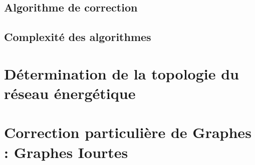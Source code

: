 \documentclass[onecolumn, 12pt]{book}
\begin{document}
	\subsection{Algorithme de correction}
%		
	\subsection{Complexit\'e des algorithmes}
%		

\section{D\'etermination de la topologie du r\'eseau \'energ\'etique}
%	
		
\section{Correction particuli\`ere de Graphes : Graphes Iourtes }
%	 
\end{document}
